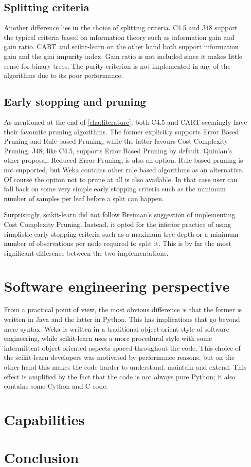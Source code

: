 
\subsection{Splitting criteria}
Another difference lies in the choice of splitting criteria. C4.5 and J48 support the typical criteria based on information theory such as information gain and gain ratio. CART and scikit-learn on the other hand both support information gain and the gini impurity index. Gain ratio is not included since it makes little sense for binary trees. The purity criterion is not implemented in any of the algorithms due to its poor performance.

\subsection{Early stopping and pruning}
As mentioned at the end of \autoref{cha:literature}, both C4.5 and CART seemingly have their favourite pruning algorithms. The former explicitly supports Error Based Pruning and Rule-based Pruning, while the latter favours Cost Complexity Pruning. J48, like C4.5, supports Error Based Pruning by default. Quinlan's other proposal, Reduced Error Pruning, is also an option. Rule based pruning is not supported, but Weka contains other rule based algorithms as an alternative. Of course the option not to prune at all is also available. In that case user can fall back on some very simple early stopping criteria such as the minimum number of samples per leaf before a split can happen.

Surprisingly, scikit-learn did not follow Breiman's suggestion of implementing Cost Complexity Pruning. Instead, it opted for the inferior practice of using simplistic early stopping criteria such as a maximum tree depth or a minimum number of observations per node required to split it. This is by far the most significant difference between the two implementations.


\section{Software engineering perspective}
From a practical point of view, the most obvious difference is that the former is written in Java and the latter in Python. This has implications that go beyond mere syntax. Weka is written in a traditional object-orient style of software engineering, while scikit-learn uses a more procedural style with some intermittent object oriented aspects spaced throughout the code. This choice of the scikit-learn developers was motivated by performance reasons, but on the other hand this makes the code harder to understand, maintain and extend. This effect is amplified by the fact that the code is not always pure Python; it also contains some Cython and C code.

\section{Capabilities}

\section{Conclusion}
